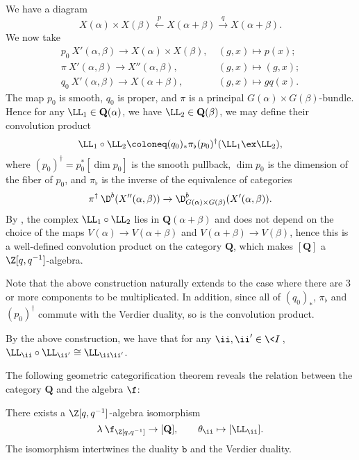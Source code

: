 We have a diagram 
\[
    X(\alpha)\times X(\beta)\xleftarrow{p}
    X(\alpha+\beta)\xrightarrow{q}X(\alpha+\beta).
\]
We now take 
\[
    \begin{aligned}
        p_0\:X'(\alpha,\beta)\to X(\alpha)\times X(\beta),&\ (g,x)\mapsto p(x);\\
        \pi\:X'(\alpha,\beta)\to X''(\alpha,\beta),&\ (g,x)\mapsto (g,x);\\
        q_0\:X'(\alpha,\beta)\to X(\alpha+\beta),&\ (g,x)\mapsto gq(x).
    \end{aligned}
\]
The map $p_0$ is smooth, $q_0$ is proper, and $\pi$ is a principal
$G(\alpha)\times G(\beta)$-bundle. Hence for any $\LL_1\in\mathbf{Q}(\alpha)$, we have
$\LL_2\in\mathbf{Q}(\beta)$, we may define their convolution product
\[
    \LL_1\circ\LL_2 \coloneq  (q_0)_*\pi_\flat(p_0)^\dagger(\LL_1\ex\LL_2),
\]
where $(p_0)^\dagger = p_0^*[\dim p_0]$ is the smooth pullback,
$\dim p_0$ is the dimension of the fiber of $p_0$,
and $\pi_\flat$ is the inverse of the equivalence of categories
\[
    \pi^\dagger\:\D^b(X''(\alpha,\beta))\to\D^b_{G(\alpha)\times G(\beta)}
    (X'(\alpha,\beta)).
\]
By \cite[Lemma 9.2.3]{L}, the complex $\LL_1\circ\LL_2$
lies in $\mathbf{Q}(\alpha+\beta)$ and does not depend on the choice of
the maps $V(\alpha)\to V(\alpha+\beta)$ and $V(\alpha+\beta)\to V(\beta)$, 
hence this is a well-defined
convolution product on the category $\mathbf{Q}$, which makes 
$[\mathbf{Q}]$ a $\Z[q,q^{-1}]$-algebra.

Note that the above construction naturally extends to the case where
there are 3 or more components to be multiplicated. In addition,
since all of $(q_0)_*$, $\pi_\flat$ and $(p_0)^\dagger$ commute
with the Verdier duality, so is the convolution product.

By the above construction, we have that for any $\ii,\ii'\in\<I\>$,
$\LL_{\ii}\circ\LL_{\ii'}\cong\LL_{\ii\ii'}$.

The following geometric categorification theorem reveals the relation
 between the category $\mathbf{Q}$
and the algebra $\f$:

\begin{theorem}[{\cite[Theorem 13.2.11]{L}}]\label{f-and-q}
    There exists a $\Z[q,q^{-1}]$-algebra isomorphism
    \[
        \lambda\:\f_{\Z[q,q^{-1}]}\to[\mathbf{Q}],\qquad
        \theta_{\ii}\mapsto[\LL_{\ii}].
    \]     
    The isomorphism
    intertwines the duality $\mathtt{b}$ and the Verdier duality.
\end{theorem}

